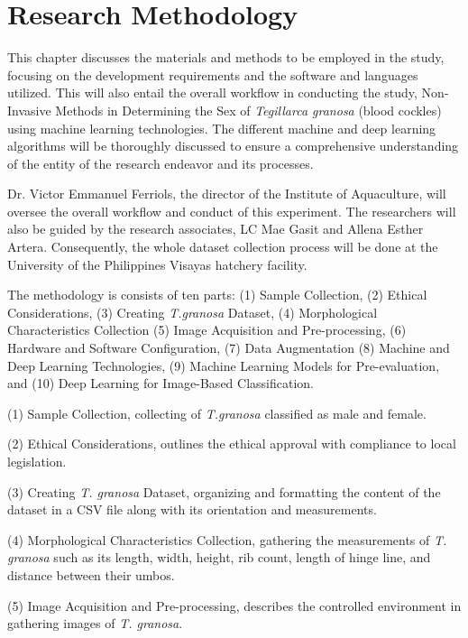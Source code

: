 \chapter{Research Methodology}
\label{sec:methodology}

This chapter discusses the materials and methods to be employed in the study, focusing on the development requirements and the software and languages utilized. This will also entail the overall workflow in conducting the study, Non-Invasive Methods in Determining the Sex of \textit{Tegillarca granosa} (blood cockles) using machine learning technologies. The different machine and deep learning algorithms will be thoroughly discussed to ensure a comprehensive understanding of the entity of the research endeavor and its processes. 

Dr. Victor Emmanuel Ferriols, the director of the Institute of Aquaculture, will oversee the overall workflow and conduct of this experiment. The researchers will also be guided by the research associates, LC Mae Gasit and Allena Esther Artera. Consequently, the whole dataset collection process will be done at the University of the Philippines Visayas hatchery facility. 

The methodology is consists of ten parts: (1) Sample Collection, (2) Ethical Considerations, (3) Creating \textit{T.granosa} Dataset, (4) Morphological Characteristics Collection (5) Image Acquisition and Pre-processing, (6) Hardware and Software Configuration, (7) Data Augmentation (8) Machine and Deep Learning Technologies, (9) Machine Learning Models for Pre-evaluation, and (10) Deep Learning for Image-Based Classification. 

(1) Sample Collection, collecting of \textit{T.granosa} classified as male and female. 

(2) Ethical Considerations, outlines the ethical approval with compliance to local legislation. 

(3) Creating \textit{T. granosa} Dataset, organizing and formatting the content of the dataset in a CSV file along with its orientation and measurements. 

(4) Morphological Characteristics Collection, gathering the measurements of \textit{T. granosa} such as its length, width, height, rib count, length of hinge line, and distance between their umbos. 

(5) Image Acquisition and Pre-processing, describes the controlled environment in gathering images of \textit{T. granosa}. 

